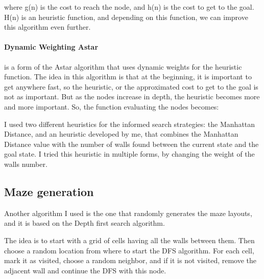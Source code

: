 \documentclass[a4paper,12pt]{report}
\begin{document}
where g(n) is the cost to reach the node, and h(n) is the cost to get to the goal. \cite{russell2016artificial} H(n) is an heuristic function, and depending on this function, we can improve this algorithm even further.


\paragraph{Dynamic Weighting Astar} is a form of the Astar algorithm that uses dynamic weights for the heuristic function. The idea in this algorithm is that at the beginning, it is important to get anywhere fast, so the heuristic, or the approximated cost to get to the goal is not as important. But as the nodes increase in depth, the heuristic becomes more and more important. So, the function evaluating the nodes becomes:

\vspace{0.3cm}
\vspace{0.3cm}\cite{wiki:01}

I used two different heuristics for the informed search strategies: the Manhattan Distance, and an heuristic developed by me, that combines the Manhattan Distance value with the number of walls found between the current state and the goal state. I tried this heuristic in multiple forms, by changing the weight of the walls number.


\subsection{Maze generation}

Another algorithm I used is the one that randomly generates the maze layouts, and it is based on the Depth first search algorithm.\cite{wiki:02}

The idea is to start with a grid of cells having all the walls between them. Then choose a random location from where to start the DFS algorithm. For each cell, mark it as visited, choose a random neighbor, and if it is not visited, remove the adjacent wall and continue the DFS with this node.
\end{document}
